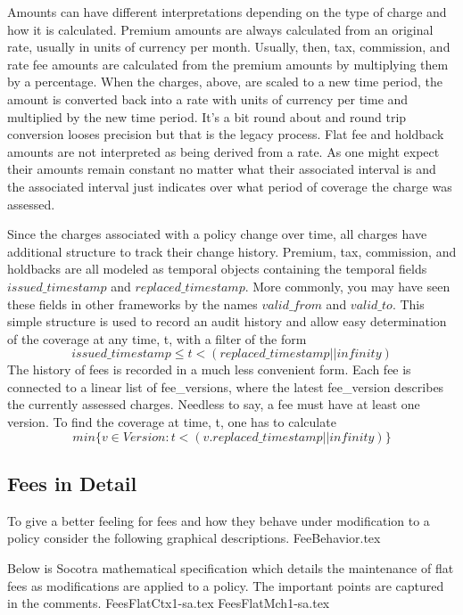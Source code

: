 Amounts can have different interpretations depending on the type of charge and how it is calculated.
Premium amounts are always calculated from an original rate, usually in units of currency per month. Usually, then,
tax, commission, and rate fee amounts are calculated from the premium amounts by multiplying them by a percentage.
When the charges, above, are scaled to a new time period, the amount is converted back into
a rate with units of currency per time and multiplied by the new time period. It's a bit
round about and round trip conversion looses precision but that is the legacy process. Flat fee and holdback amounts are
not interpreted as being derived from a rate. As one might expect their amounts remain constant no
matter what their associated interval is and the associated interval just indicates over what period of coverage the
charge was assessed.

Since the charges associated with a policy change over time, all charges have additional structure to track their
change history. Premium, tax, commission, and holdbacks are all modeled as temporal objects containing the temporal
fields $issued\_timestamp$ and $replaced\_timestamp$.
More commonly, you may have seen these fields in other frameworks by the names $valid\_from$ and
$valid\_to$. This simple structure is used to record an audit history and allow easy determination of the
coverage at any time, t, with a filter of the form
\begin{equation*}
issued\_timestamp \leq t < (replaced\_timestamp || infinity)
\end{equation*}
The history of fees is recorded in a much less convenient form. Each fee is connected to a linear list of fee\_versions, where
the latest fee\_version describes the currently assessed charges. Needless to say, a fee must have at least one version.
To find the coverage at time, t, one has to calculate
\begin{equation*}
min \lbrace v \in Version : t < (v.replaced\_timestamp || infinity) \rbrace
\end{equation*}

\subsection{Fees in Detail}
To give a better feeling for fees and how they behave under modification to a policy consider the following
graphical descriptions.
{FeeBehavior.tex}
\newpage

Below is Socotra mathematical specification which details the maintenance of flat fees as modifications are applied to a
policy. The important points are captured in the comments.
{FeesFlatCtx1-sa.tex}
{FeesFlatMch1-sa.tex}

